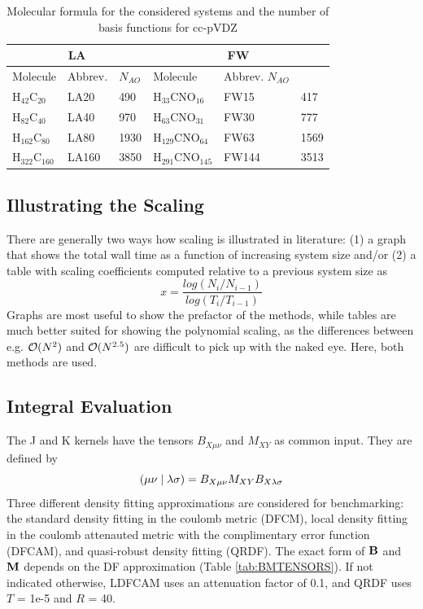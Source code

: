 \begin{table}
\centering
\begin{tabular}{llllll}
\hline
\multicolumn{3}{c}{LA} & \multicolumn{3}{c}{FW} \\ \hline
Molecule & Abbrev. & $N_{AO}$ & Molecule & Abbrev. $N_{AO}$ \\ \hline
H$_{42}$C$_{20}$ & LA20 & 490 & H$_{33}$CNO$_{16}$ & FW15 & 417 \\
H$_{82}$C$_{40}$ & LA40 & 970 & H$_{63}$CNO$_{31}$ & FW30 & 777 \\
H$_{162}$C$_{80}$ & LA80 & 1930 & H$_{129}$CNO$_{64}$ & FW63 & 1569  \\
H$_{322}$C$_{160}$ & LA160 & 3850 & H$_{291}$CNO$_{145}$ & FW144 & 3513   
\end{tabular}
\label{fig:GS_NBAS}
\caption{Molecular formula for the considered systems and the number of basis functions for cc-pVDZ}
\end{table}

\subsection{Illustrating the Scaling}

There are generally two ways how scaling is illustrated in literature: (1) a graph that shows the total wall time as a function of increasing system size and/or (2) a table with scaling coefficients computed relative to a previous system size as
\begin{equation}
x = \frac{log(N_i/N_{i-1})}{log(T_i/T_{i-1})}
\end{equation} 
\noindent Graphs are most useful to show the prefactor of the methods, while tables are much better suited for showing the polynomial scaling, as the differences between e.g. $\mathcal{O}(N^{2})$ and $\mathcal{O}(N^{2.5})$ are difficult to pick up with the naked eye. Here, both methods are used. 

\FloatBarrier

\subsection{Integral Evaluation}

The J and K kernels have the tensors $B_{X\mu\nu}$ and $M_{XY}$ as common input. They are defined by
\begin{equation}
\left( \mu\nu \mid \lambda\sigma \right) = B_{X\mu\nu} M_{XY} B_{X\lambda\sigma}
\end{equation}
\noindent Three different density fitting approximations are considered for benchmarking: the standard density fitting in the coulomb metric (DFCM), local density fitting in the coulomb attenauted metric with the complimentary error function (DFCAM), and quasi-robust density fitting (QRDF). The exact form of $\mathbf{B}$ and $\mathbf{M}$ depends on the DF approximation (Table \ref{tab:BMTENSORS}). If not indicated otherwise, LDFCAM uses an attenuation factor of 0.1, and QRDF uses $T$ = 1e-5 and $R$ = 40. 

